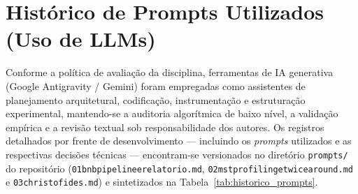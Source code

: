 \documentclass[12pt,a4paper]{article}
\renewcommand{\_}{\origunderscore\hspace{0pt}}
\begin{document}
\section{Histórico de Prompts Utilizados (Uso de LLMs)}
Conforme a política de avaliação da disciplina, ferramentas de IA generativa (Google Antigravity / Gemini) foram empregadas como assistentes de planejamento arquitetural, codificação, instrumentação e estruturação experimental, mantendo-se a auditoria algorítmica de baixo nível, a validação empírica e a revisão textual sob responsabilidade dos autores. Os registros detalhados por frente de desenvolvimento — incluindo os \textit{prompts} utilizados e as respectivas decisões técnicas — encontram-se versionados no diretório \texttt{prompts/} do repositório (\texttt{01\_bnb\_pipeline\_e\_relatorio.md}, \texttt{02\_mst\_profiling\_e\_twice\_around.md} e \texttt{03\_christofides.md}) e sintetizados na Tabela~\ref{tab:historico_prompts}.
\end{document}
